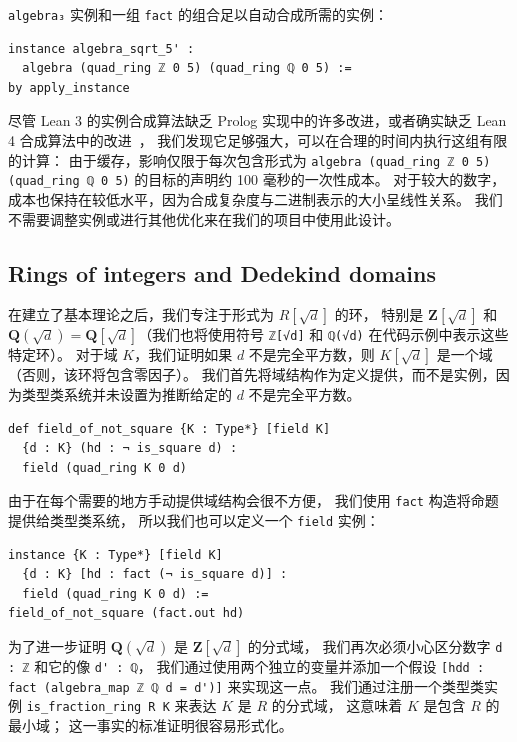 \documentclass[sigplan,10pt,nonacm,
screen]{acmart} \settopmatter{printfolios=true,printccs=false,printacmref=false}
\newcommand{\QQ}{\mathbf{Q}}
\newcommand{\ZZ}{\mathbf{Z}}
\begin{document}
\lstinline{algebra₃} 实例和一组 \lstinline{fact} 的组合足以自动合成所需的实例：
\begin{lstlisting}
instance algebra_sqrt_5' :
  algebra (quad_ring ℤ 0 5) (quad_ring ℚ 0 5) :=
by apply_instance
\end{lstlisting}
尽管 Lean 3 的实例合成算法缺乏 Prolog 实现中的许多改进，或者确实缺乏 Lean 4 合成算法中的改进~\cite{lean-tabled-typeclasses}，
我们发现它足够强大，可以在合理的时间内执行这组有限的计算：
由于缓存，影响仅限于每次包含形式为 \lstinline{algebra (quad_ring ℤ 0 5) (quad_ring ℚ 0 5)} 的目标的声明约 100 毫秒的一次性成本。
对于较大的数字，成本也保持在较低水平，因为合成复杂度与二进制表示的大小呈线性关系。
我们不需要调整实例或进行其他优化来在我们的项目中使用此设计。

    \subsection{Rings of integers and Dedekind domains} \label{sec:ring_of_integers}

在建立了基本理论之后，我们专注于形式为 $R[\sqrt{d}]$ 的环，
特别是 $\ZZ[\sqrt{d}]$ 和 $\QQ(\sqrt{d})=\QQ[\sqrt{d}]$（我们也将使用符号 \lstinline{ℤ[√d]} 和 \lstinline{ℚ(√d)} 在代码示例中表示这些特定环）。
对于域 $K$，我们证明如果 $d$ 不是完全平方数，则 $K[\sqrt{d}]$ 是一个域（否则，该环将包含零因子）。
我们首先将域结构作为定义提供，而不是实例，因为类型类系统并未设置为推断给定的 $d$ 不是完全平方数。
\begin{lstlisting}
def field_of_not_square {K : Type*} [field K]
  {d : K} (hd : ¬ is_square d) :
  field (quad_ring K 0 d)
\end{lstlisting}
由于在每个需要的地方手动提供域结构会很不方便，
我们使用 \lstinline{fact} 构造将命题提供给类型类系统，
所以我们也可以定义一个 \lstinline{field} 实例：
\begin{lstlisting}
instance {K : Type*} [field K]
  {d : K} [hd : fact (¬ is_square d)] :
  field (quad_ring K 0 d) :=
field_of_not_square (fact.out hd)
\end{lstlisting}

为了进一步证明 $\QQ(\sqrt{d})$ 是 $\ZZ[\sqrt{d}]$ 的分式域，
我们再次必须小心区分数字 \lstinline{d : ℤ} 和它的像 \lstinline{d' : ℚ}，
我们通过使用两个独立的变量并添加一个假设 \lstinline{[hdd : fact (algebra_map ℤ ℚ d = d')]} 来实现这一点。
我们通过注册一个类型类实例 \lstinline{is_fraction_ring R K} 来表达 $K$ 是 $R$ 的分式域，
这意味着 $K$ 是包含 $R$ 的最小域；
这一事实的标准证明很容易形式化。
\end{document}
